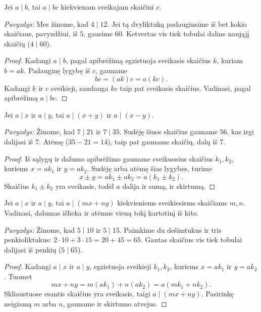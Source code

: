 \documentclass[11pt,a4paper]{scrartcl}
\begin{document}
\begin{proposition}
Jei \(a\mid b\), tai \(a\mid bc\) kiekvienam sveikajam skaičiui \(c\).
\end{proposition}
\textit{Pavyzdys:} Mes žinome, kad \(4 \mid 12\). Jei tą dvyliktuką padauginsime iš bet kokio skaičiaus, pavyzdžiui, iš $5$, gausime $60$. Ketvertas vis tiek tobulai dalins naująjį skaičių (\(4 \mid 60\)).
\begin{proof}
Kadangi \(a\mid b\), pagal apibrėžimą egzistuoja sveikasis skaičius \(k\), kuriam \(b=ak\). Padauginę lygybę iš \(c\), gauname
\begin{equation*}
    bc=(ak)c=a(kc).
\end{equation*}
Kadangi \(k\) ir \(c\) sveikieji, sandauga \(kc\) taip pat sveikasis skaičius. Vadinasi, pagal apibrėžimą \(a\mid bc\).
\end{proof}

\begin{proposition}
Jei \(a\mid x\) ir \(a\mid y\), tai \(a\mid(x+y)\) ir \(a\mid(x-y)\).
\end{proposition}
\textit{Pavyzdys:} Žinome, kad \(7 \mid 21\) ir \(7 \mid 35\). Sudėję šiuos skaičius gauname $56$, kas irgi dalijasi iš $7$. Atėmę (\(35 - 21 = 14\)), taip pat gauname skaičių, dalų iš $7$.
\begin{proof}
Iš sąlygų ir dalumo apibrėžimo gauname sveikuosius skaičius \(k_1,k_2\), kuriems \(x=ak_1\) ir \(y=ak_2\). Sudėję arba atėmę šias lygybes, turime
\begin{equation*}
    x\pm y=ak_1\pm ak_2=a(k_1\pm k_2).
\end{equation*}
Skaičius \(k_1\pm k_2\) yra sveikasis, todėl \(a\) dalija ir sumą, ir skirtumą.
\end{proof}

\begin{proposition}
Jei \(a\mid x\) ir \(a\mid y\), tai \(a\mid(mx+ny)\) kiekvieniems sveikiesiems skaičiams \(m,n\). Vadinasi, dalumas išlieka ir atėmus vieną tokį kartotinį iš kito.
\end{proposition}
\textit{Pavyzdys:} Žinome, kad \(5 \mid 10\) ir \(5 \mid 15\). Paimkime du dešimtukus ir tris penkioliktukus: \(2 \cdot 10 + 3 \cdot 15 = 20 + 45 = 65\). Gautas skaičius vis tiek tobulai dalijasi iš penkių (\(5 \mid 65\)).
\begin{proof}
Kadangi \(a\mid x\) ir \(a\mid y\), egzistuoja sveikieji \(k_1,k_2\), kuriems \(x=ak_1\) ir \(y=ak_2\). Tuomet
\begin{equation*}
    mx+ny=m(ak_1)+n(ak_2)=a(mk_1+nk_2).
\end{equation*}
Skliaustuose esantis skaičius yra sveikasis, taigi \(a\mid(mx+ny)\). Pasirinkę neigiamą \(m\) arba \(n\), gauname ir skirtumo atvejus.
\end{proof}
\end{document}
